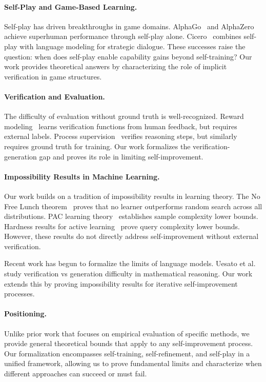 \documentclass{article}
\theoremstyle{definition}
\theoremstyle{remark}
\begin{document}
\paragraph{Self-Play and Game-Based Learning.}
Self-play has driven breakthroughs in game domains. AlphaGo~\cite{silver2016mastering} and AlphaZero~\cite{silver2017mastering} achieve superhuman performance through self-play alone. Cicero~\cite{meta2022cicero} combines self-play with language modeling for strategic dialogue. These successes raise the question: when does self-play enable capability gains beyond self-training? Our work provides theoretical answers by characterizing the role of implicit verification in game structures.

\paragraph{Verification and Evaluation.}
The difficulty of evaluation without ground truth is well-recognized. Reward modeling~\cite{christiano2017deep} learns verification functions from human feedback, but requires external labels. Process supervision~\cite{lightman2023lets} verifies reasoning steps, but similarly requires ground truth for training. Our work formalizes the verification-generation gap and proves its role in limiting self-improvement.

\paragraph{Impossibility Results in Machine Learning.}
Our work builds on a tradition of impossibility results in learning theory. The No Free Lunch theorem~\cite{wolpert1997no} proves that no learner outperforms random search across all distributions. PAC learning theory~\cite{valiant1984theory} establishes sample complexity lower bounds. Hardness results for active learning~\cite{dasgupta2005analysis} prove query complexity lower bounds. However, these results do not directly address self-improvement without external verification.

Recent work has begun to formalize the limits of language models. Uesato et al.~\cite{uesato2022solving} study verification vs generation difficulty in mathematical reasoning. Our work extends this by proving impossibility results for iterative self-improvement processes.

\paragraph{Positioning.}
Unlike prior work that focuses on empirical evaluation of specific methods, we provide general theoretical bounds that apply to any self-improvement process. Our formalization encompasses self-training, self-refinement, and self-play in a unified framework, allowing us to prove fundamental limits and characterize when different approaches can succeed or must fail.
\end{document}
